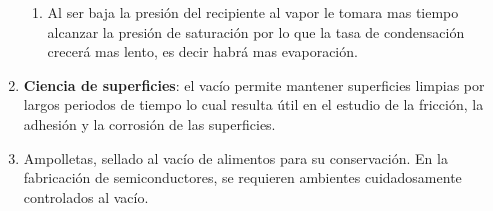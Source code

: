 \begin{enumerate}[resume]
\begin{enumerate}
        \item %
        Al ser baja la presión del recipiente al vapor le tomara mas tiempo alcanzar la presión de saturación por lo que la tasa de condensación crecerá mas lento, es decir habrá mas evaporación. 
        
    \end{enumerate}
    
    \item %
    \textbf{Ciencia de superficies}: el vacío permite mantener superficies limpias por largos periodos de tiempo lo cual resulta útil en el estudio de la fricción, la adhesión y la corrosión de las superficies.
    \item %
    Ampolletas, sellado al vacío de alimentos para su conservación. En la fabricación de semiconductores, se requieren ambientes cuidadosamente controlados al vacío.
\end{enumerate}

